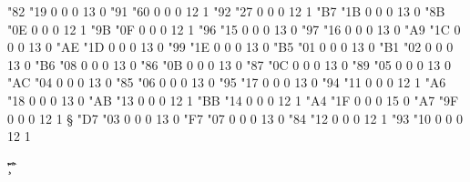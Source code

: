 \setcharcode  "82  "19    0    0     0  13  0  \expandto {\clq}           %
\setcharcode  "91  "60    0    0     0  12  1  \texmacro \crq  \savexchr  %
\setcharcode  "92  "27    0    0     0  12  1  \texmacro \erq  \savexchr  %
\setcharcode  "B7  "1B    0    0     0  13  0  \expandto {$\cdot$}
\setcharcode  "8B  "0E    0    0     0  12  1  \texmacro \flq
\setcharcode  "9B  "0F    0    0     0  12  1  \texmacro \frq
\setcharcode  "96  "15    0    0     0  13  0  \expandto {--}
\setcharcode  "97  "16    0    0     0  13  0  \expandto {---}
\setcharcode  "A9  "1C    0    0     0  13  0  \expandto {\copyright}
\setcharcode  "AE  "1D    0    0     0  13  0  \expandto {\registered}
\setcharcode  "99  "1E    0    0     0  13  0  \expandto {\trademark}
\setcharcode  "B5  "01    0    0     0  13  0  \expandto {$\mu$}
\setcharcode  "B1  "02    0    0     0  13  0  \expandto {$\pm$}
\setcharcode  "B6  "08    0    0     0  13  0  \expandto {\P}
\setcharcode  "86  "0B    0    0     0  13  0  \expandto {\dag}
\setcharcode  "87  "0C    0    0     0  13  0  \expandto {\ddag}
\setcharcode  "89  "05    0    0     0  13  0  \expandto {\promile}
\setcharcode  "AC  "04    0    0     0  13  0  \expandto {$\neg$}
\setcharcode  "85  "06    0    0     0  13  0  \expandto {\dots}
\setcharcode  "95  "17    0    0     0  13  0  \expandto {$\bullet$}
\setcharcode  "94  "11    0    0     0  12  1  %
\setcharcode  "A6  "18    0    0     0  13  0  \expandto {\pipe}
\setcharcode  "AB  "13    0    0     0  12  1  %
\setcharcode  "BB  "14    0    0     0  12  1  %
\setcharcode  "A4  "1F    0    0     0  15  0  %
\setcharcode  "A7  "9F    0    0     0  12  1  \texmacro \S
\setcharcode  "D7  "03    0    0     0  13  0  \expandto {$\times$}
\setcharcode  "F7  "07    0    0     0  13  0  \expandto {$\div$}
\setcharcode  "84  "12    0    0     0  12  1  \texmacro \clqq
\setcharcode  "93  "10    0    0     0  12  1  \texmacro \crqq

\redefaccent \'
\redefaccent \v 
\redefaccent \" 
\redefaccent \.
\redefaccent \c 
\redefaccent \^ 
\redefaccent \r 
\redefaccent \H
\redefaccent \og

